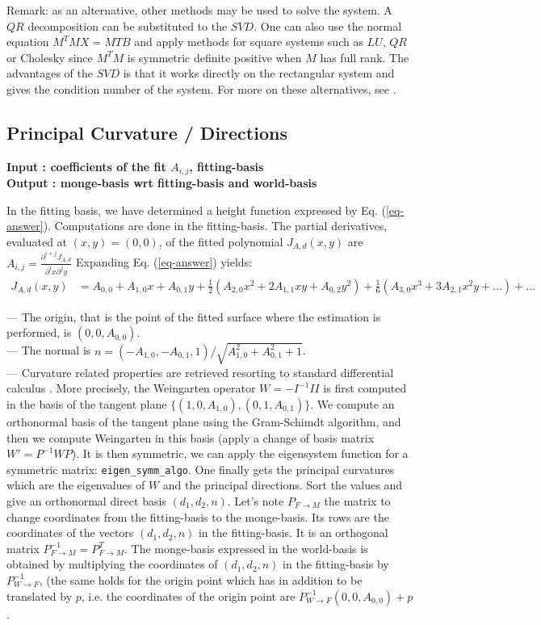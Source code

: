\medskip
Remark: as an alternative, other methods may be used to solve the
system. A $QR$ decomposition can be substituted to the $SVD$. One can
also use the normal equation $M^TMX=MTB$ and apply methods for square
systems such as $LU$, $QR$ or Cholesky since $M^TM$ is symmetric
definite positive when $M$ has full rank. 
The advantages of the $SVD$
is that it works directly on the rectangular system and gives the
condition number of the system. For more on these alternatives, see
\cite{gl-mc-83}.

\subsection{Principal  Curvature / Directions}

{\bf Input : coefficients of the fit $A_{i,j}$, 
fitting-basis \\
Output : monge-basis wrt fitting-basis and world-basis
}

In the fitting basis, we have determined a height function expressed
by Eq. (\ref{eq-answer}). Computations are done in the fitting-basis.
The partial derivatives, evaluated at $(x,y)=(0,0)$, of the fitted
polynomial $J_{A,d}(x,y)$ are
$A_{i,j}=\frac{\partial^{i+j}J_{A,d}}{\partial^ix \partial^jy}$
Expanding Eq. (\ref{eq-answer}) yields:
\begin{eqnarray}
J_{A,d}(x,y)&=
A_{0,0}+A_{1,0}x+A_{0,1}y+\frac{1}{2}(A_{2,0}x^2+2A_{1,1}xy+A_{0,2}y^2) 
+ \frac{1}{6}(A_{3,0}x^3+3A_{2,1}x^2y+\ldots )+ \ldots 
\end{eqnarray}


--- The origin, that is the point of the fitted surface where the
estimation is performed, is $(0,0,A_{0,0})$. \\
--- The normal is
$n=(-A_{1,0},-A_{0,1},1)/\sqrt{A_{1,0}^2+A_{0,1}^2+1}$.\\
--- Curvature related properties are retrieved resorting to standard
differential calculus \cite{c-dgcs-76}. More precisely, the Weingarten
operator $W=-I^{-1}II$ is first computed in the basis of the tangent
plane $\{ (1,0,A_{1,0}), (0,1,A_{0,1}) \}$. We compute an orthonormal
basis of the tangent plane using the Gram-Schimdt algorithm, and then
we compute Weingarten in this basis (apply a change of basis matrix
$W'=P^{-1}WP$). It is then symmetric, we can apply the eigensystem
function for a symmetric matrix:
\verb+eigen_symm_algo+.
One finally gets the principal curvatures which are the eigenvalues of
$W$ and the principal directions. Sort the values and give an
orthonormal direct basis $(d_1,d_2,n)$. Let's note $P_{F
\rightarrow M}$ the matrix to change coordinates from the
fitting-basis to the monge-basis. Its rows are the coordinates of the
vectors $(d_1,d_2,n)$ in the fitting-basis. It is an orthogonal matrix
$P_{F \rightarrow M}^{-1}=P_{F \rightarrow M}^T$. The monge-basis
expressed in the world-basis is obtained by multiplying the coordinates
of $(d_1,d_2,n)$ in the fitting-basis by $P_{W\rightarrow F}^{-1}$,
(the same holds for the origin point which has in addition to be
translated by $p$, i.e. the coordinates of the origin point are
$P_{W\rightarrow F}^{-1} (0,0,A_{0,0}) +p$.

